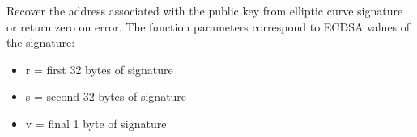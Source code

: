 Recover the address associated with the public key from elliptic curve signature or return zero on error. The function parameters correspond to ECDSA values of the signature:

\begin{itemize}
    \item[] r = first 32 bytes of signature
    \item[] s = second 32 bytes of signature
    \item[] v = final 1 byte of signature
\end{itemize}




